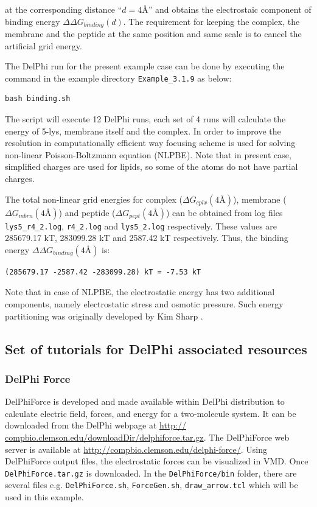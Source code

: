 \documentclass[9pt,tutorial,pubversion]{livecoms}
\begin{document}
at the corresponding distance ``$ d = 4 \text{\AA} $'' and obtains the electrostaic component of binding energy $ \Delta\Delta G_{binding}(d) $. The requirement for keeping the complex, the membrane and the peptide at the same position and same scale is to cancel the artificial grid energy.

The DelPhi run for the present example case can be done by executing the command in the example directory \texttt{Example\_3.1.9} as below:
\begin{verbatim}
bash binding.sh
\end{verbatim} 

The script will execute 12 DelPhi runs, each set of 4 runs will calculate the energy of 5-lys, membrane itself and the complex. In order to improve the resolution in computationally efficient way focusing scheme is used for solving non-linear Poisson-Boltzmann equation (NLPBE). Note that in present case, simplified charges are used for lipids, so some of the atoms do not have partial charges.

The total non-linear grid energies for complex ($ \Delta G_{cplx}(4 \text{\AA}) $), membrane ($ \Delta G_{mbrn}(4 \text{\AA}) $) and peptide ($ \Delta G_{pept}(4 \text{\AA}) $) can be obtained from log files \texttt{lys5\_r4\_2.log}, \texttt{r4\_2.log} and \texttt{lys5\_2.log} respectively. These values are 285679.17 kT, 283099.28 kT and 2587.42 kT respectively. Thus, the binding energy $\Delta\Delta G_{binding}(4 \text{\AA}) $ is:

\begin{verbatim}
(285679.17 -2587.42 -283099.28) kT = -7.53 kT
\end{verbatim}

Note that in case of NLPBE, the electrostatic energy has two additional components, namely electrostatic stress and osmotic pressure. Such energy partitioning was originally developed by Kim Sharp \cite{sharp1990calculating}.

\subsection{Set of tutorials for DelPhi associated resources}

\subsubsection{DelPhi Force}

DelPhiForce\cite{li2017delphiforce} is developed and made available within DelPhi distribution to calculate electric field, forces, and energy for a two-molecule system. It can be downloaded from the DelPhi webpage at \url{http:// compbio.clemson.edu/downloadDir/delphiforce.tar.gz}. The DelPhiForce web server is available at \url{http://compbio.clemson.edu/delphi-force/}. Using DelPhiForce output files, the electrostatic forces can be visualized in VMD\cite{humphrey1996vmd}. Once \texttt{DelPhiForce.tar.gz} is downloaded. In the \texttt{DelPhiForce/bin} folder, there are several files e.g. 
\texttt{DelPhiForce.sh}, \texttt{ForceGen.sh}, \texttt{draw\_arrow.tcl} which will be used in this example.
\end{document}
